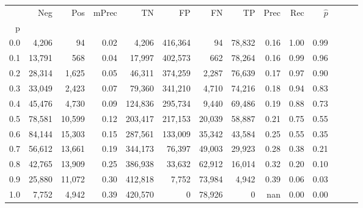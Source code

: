 \begin{tabular}{rrrrrrrrrrrrrr}
\toprule
{} &     Neg &     Pos & mPrec &       TN &       FP &      FN &      TP &  Prec &   Rec & $\hat{p}$ \\
p   &         &         &       &          &          &         &         &       &       &           \\
\midrule
0.0 &   4,206 &      94 &  0.02 &    4,206 &  416,364 &      94 &  78,832 &  0.16 &  1.00 &      0.99 \\
0.1 &  13,791 &     568 &  0.04 &   17,997 &  402,573 &     662 &  78,264 &  0.16 &  0.99 &      0.96 \\
0.2 &  28,314 &   1,625 &  0.05 &   46,311 &  374,259 &   2,287 &  76,639 &  0.17 &  0.97 &      0.90 \\
0.3 &  33,049 &   2,423 &  0.07 &   79,360 &  341,210 &   4,710 &  74,216 &  0.18 &  0.94 &      0.83 \\
0.4 &  45,476 &   4,730 &  0.09 &  124,836 &  295,734 &   9,440 &  69,486 &  0.19 &  0.88 &      0.73 \\
0.5 &  78,581 &  10,599 &  0.12 &  203,417 &  217,153 &  20,039 &  58,887 &  0.21 &  0.75 &      0.55 \\
0.6 &  84,144 &  15,303 &  0.15 &  287,561 &  133,009 &  35,342 &  43,584 &  0.25 &  0.55 &      0.35 \\
0.7 &  56,612 &  13,661 &  0.19 &  344,173 &   76,397 &  49,003 &  29,923 &  0.28 &  0.38 &      0.21 \\
0.8 &  42,765 &  13,909 &  0.25 &  386,938 &   33,632 &  62,912 &  16,014 &  0.32 &  0.20 &      0.10 \\
0.9 &  25,880 &  11,072 &  0.30 &  412,818 &    7,752 &  73,984 &   4,942 &  0.39 &  0.06 &      0.03 \\
1.0 &   7,752 &   4,942 &  0.39 &  420,570 &        0 &  78,926 &       0 &   nan &  0.00 &      0.00 \\
\bottomrule
\end{tabular}
